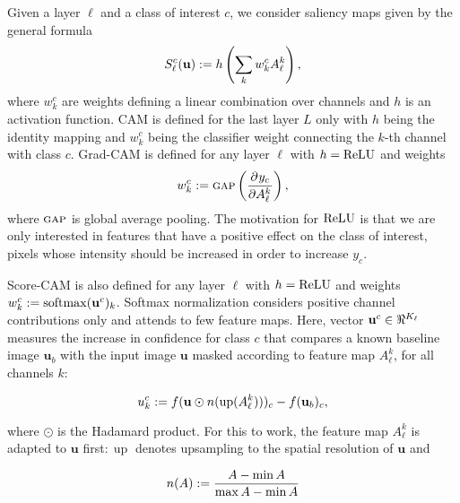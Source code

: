 Given a layer $\ell$ and a class of interest $c$, we consider saliency maps given by the general 
formula
\begin{equation}
	S^c_\ell(\mathbf{u}) \mathrel{:=} h \left( \sum_k w^c_k A^k_\ell \right),
\label{eq:sal}
\end{equation}
where $w^c_k$ are weights defining a linear combination over channels and $h$ is an activation 
function. CAM \parencite{zhou2016learning} is defined for the last layer $L$ only with $h$ being the 
identity mapping and $w^c_k$ being the classifier weight connecting the $k$-th channel with 
class $c$. Grad-CAM \parencite{selvaraju2017grad} is defined for any layer $\ell$ with $h = {\operatorname{ReLU}}$ and 
weights
\begin{equation}
	w^c_k \mathrel{:=} {\textsc{gap}} \left( \frac{\partial^{}{y_c}}{\partial{{A^k_\ell}^{}}} \right),
\label{eq:gcam}
\end{equation}
where ${\textsc{gap}}$ is global average pooling.
The motivation for ${\operatorname{ReLU}}$ is that we are only interested in features that have a positive effect 
on the class of interest, \ie pixels whose intensity should be increased in order to increase $y_c$.

Score-CAM \parencite{wang2020score} is also defined for any layer $\ell$ with $h = {\operatorname{ReLU}}$ and weights 
$w^c_k \mathrel{:=} \operatorname{softmax}(\mathbf{u}^c)_k$.  Softmax normalization considers positive channel contributions 
only and attends to few feature maps.
Here, vector $\mathbf{u}^c \in \real^{K_\ell}$ measures the increase in confidence for class $c$ that 
compares a known baseline image $\mathbf{u}_b$ with the input image $\mathbf{u}$ masked according to feature 
map $A^k_\ell$, for all channels $k$:

\begin{equation}
	u^c_k \mathrel{:=} f(\mathbf{u} \odot n(\operatorname{up}( A^k_\ell )))_c - f(\mathbf{u}_b)_c,
\label{eq:s-cam}
\end{equation}

where $\odot$ is the Hadamard product. For this to work, the feature map $A^k_\ell$ is adapted
 to $\mathbf{u}$ first$:\operatorname{up}$ denotes upsampling to the spatial resolution of $\mathbf{u}$ and

\begin{equation}
	n(A) \mathrel{:=} \frac{A - \min A}{\max A - \min A}
\label{eq:norm}
\end{equation}

